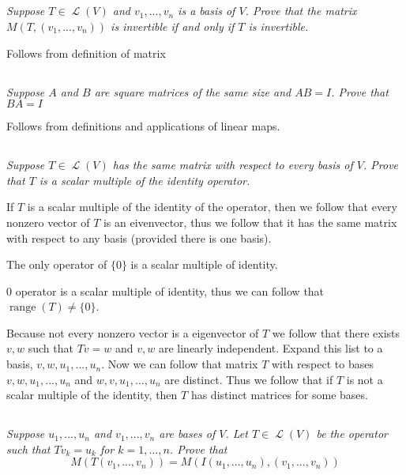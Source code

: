 \documentclass[11pt,oneside,titlepage]{book}
\DeclareMathOperator \map {\mathcal {L}}
\DeclareMathOperator \range {range}
\begin{document}
\subsection{}

\textit{Suppose $T \in \map(V)$ and $v_1, ..., v_n$ is a basis of $V$. Prove that the matrix
  $M(T, (v_1, ..., v_n))$ is invertible if and only if $T$ is invertible.}

Follows from definition of matrix

\subsection{}

\textit{Suppose $A$ and $B$ are square matrices of the same size and $AB = I$. Prove that
  $BA = I$}

Follows from definitions and applications of linear maps.

\subsection{}

\textit{Suppose $T \in \map(V)$ has the same matrix with respect to every basis of $V$.
  Prove that $T$ is a scalar multiple of the identity operator.}

If $T$ is a scalar multiple of the identity of the operator, then we follow that
every nonzero vector of $T$ is an eivenvector, thus we follow that it has the same
matrix with respect to any basis (provided there is one basis).

The only operator of $\{0\}$ is a scalar multiple of identity.

$0$ operator is a scalar multiple of identity, thus we can follow that $\range(T) \neq \{0\}$.

Because not every nonzero vector is a eigenvector of $T$ we follow that there exists
$v, w$ such that $Tv = w$ and $v, w$ are linearly independent. Expand this list  to a basis,
$v, w, u_1, ..., u_n$. Now we can follow that matrix $T$ with respect to bases
$v, w, u_1, ..., u_n$ and $w, v, u_1, ..., u_n$ are distinct. Thus we follow that
if $T$ is not a scalar multiple of the identity, then $T$ has distinct matrices
for some bases.

\subsection{}

\textit{Suppose $u_1, ..., u_n$ and $v_1, ..., v_n$ are bases of $V$. Let $T \in \map(V)$ be
  the operator such that $Tv_k = u_k$ for $k = 1, ..., n$. Prove that 
  $$M(T(v_1, ..., v_n)) = M(I(u_1, ..., u_n), (v_1, ..., v_n))$$
}
\end{document}
